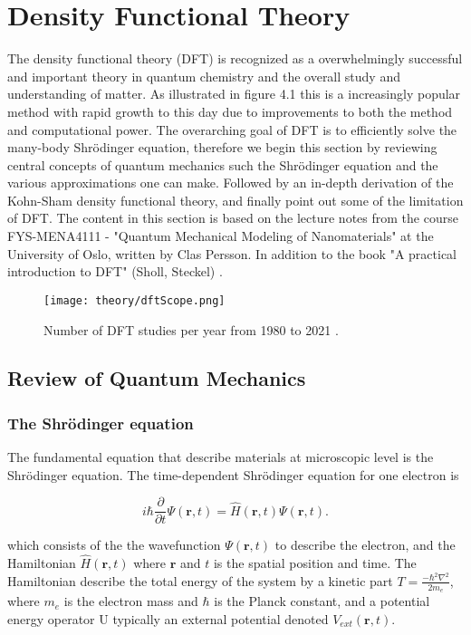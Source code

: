 \chapter{Density Functional Theory}
\label{sec:DFT}

The density functional theory (DFT) is recognized as a overwhelmingly successful and important theory in quantum chemistry and the overall study and understanding of matter. As illustrated in figure 4.1 this is a increasingly popular method with rapid growth to this day due to improvements to both the method and computational power. The overarching goal of DFT is to efficiently solve the many-body Shr\"{o}dinger equation, therefore we begin this section by reviewing central concepts of quantum mechanics such the Shr\"{o}dinger equation and the various approximations one can make. Followed by an in-depth derivation of the Kohn-Sham density functional theory, and finally point out some of the limitation of DFT. The content in this section is based on the lecture notes \cite{persson2020} from the course FYS-MENA4111 - "Quantum Mechanical Modeling of Nanomaterials" at the University of Oslo, written by Clas Persson. In addition to the book "A practical introduction to DFT" (Sholl, Steckel) \cite{Sholl2009}. 

\begin{figure}[H]
\texttt{[image: theory/dftScope.png]}
\caption{Number of DFT studies per year from 1980 to 2021 \cite{dimensions}.}
\end{figure}

\section{Review of Quantum Mechanics}

\subsection{The Shr\"{o}dinger equation}
The fundamental equation that describe materials at microscopic level is the Shr\"{o}dinger equation. The time-dependent Shr\"{o}dinger equation for one electron is

\begin{equation}
    i\hbar\frac{\partial}{\partial t}\Psi(\boldsymbol{r}, t) = \hat{H}(\boldsymbol{r},t)\Psi(\boldsymbol{r}, t).
\end{equation}

which consists of the the wavefunction $\Psi(\boldsymbol{r},t)$ to describe the electron, and the Hamiltonian $\hat{H}(\boldsymbol{r},t)$ where $\boldsymbol{r}$ and $t$ is the spatial position and time. The Hamiltonian describe the total energy of the system by a kinetic part $T = \frac{-\hbar^2\nabla^2}{2m_e}$, where $m_e$ is the electron mass and $\hbar$ is the Planck constant, and a potential energy operator U typically an external potential denoted $V_{ext}(\boldsymbol{r}, t)$. 

